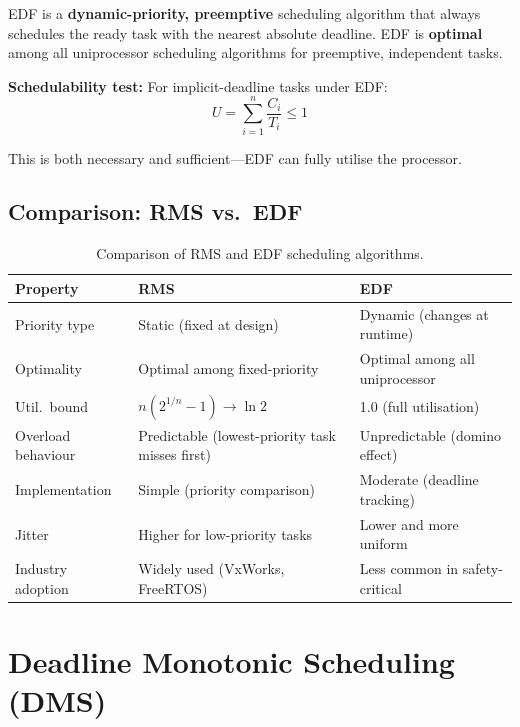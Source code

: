 \begin{definition}
EDF is a \textbf{dynamic-priority, preemptive} scheduling algorithm that always schedules the ready task with the nearest absolute deadline. EDF is \textbf{optimal} among all uniprocessor scheduling algorithms for preemptive, independent tasks.
\end{definition}

\textbf{Schedulability test:} For implicit-deadline tasks under EDF:
\[
U = \sum_{i=1}^{n} \frac{C_i}{T_i} \leq 1
\]

This is both necessary and sufficient---EDF can fully utilise the processor.

\subsection{Comparison: RMS vs.\ EDF}

\begin{table}[H]
\centering
\caption{Comparison of RMS and EDF scheduling algorithms.}
\label{tab:sched:rms-vs-edf}
\begin{tabularx}{\linewidth}{@{}lXX@{}}
\toprule
\textbf{Property} & \textbf{RMS} & \textbf{EDF} \\
\midrule
Priority type & Static (fixed at design) & Dynamic (changes at runtime) \\
Optimality & Optimal among fixed-priority & Optimal among all uniprocessor \\
Util.\ bound & $n(2^{1/n}-1) \to \ln 2$ & 1.0 (full utilisation) \\
Overload behaviour & Predictable (lowest-priority task misses first) & Unpredictable (domino effect) \\
Implementation & Simple (priority comparison) & Moderate (deadline tracking) \\
Jitter & Higher for low-priority tasks & Lower and more uniform \\
Industry adoption & Widely used (VxWorks, FreeRTOS) & Less common in safety-critical \\
\bottomrule
\end{tabularx}
\end{table}

\section{Deadline Monotonic Scheduling (DMS)}
\label{sec:sched:dms}

